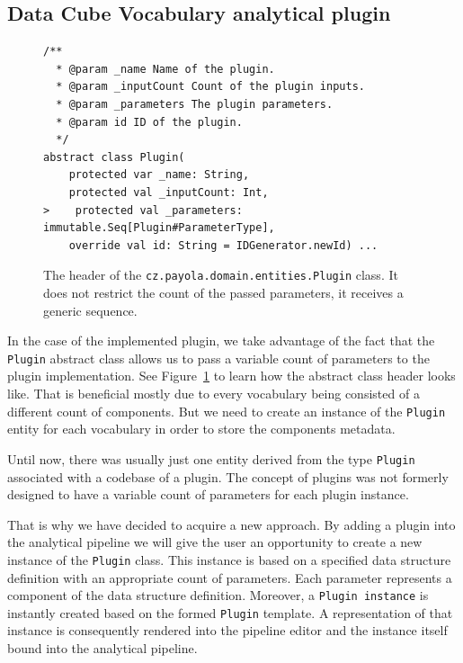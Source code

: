\subsection{Data Cube Vocabulary analytical plugin}

\begin{figure}
  \begin{verbatim}
/**
  * @param _name Name of the plugin.
  * @param _inputCount Count of the plugin inputs.
  * @param _parameters The plugin parameters.
  * @param id ID of the plugin.
  */
abstract class Plugin(
    protected var _name: String,
    protected val _inputCount: Int,
>    protected val _parameters: immutable.Seq[Plugin#ParameterType],
    override val id: String = IDGenerator.newId) ...
  \end{verbatim}
  \caption{The header of the \texttt{cz.payola.domain.entities.Plugin} class. It does not restrict the count
  of the passed parameters, it receives a generic sequence.}
  \label{fig:plugin-trait-code}
\end{figure}

In the case of the implemented plugin, we take advantage of the fact that the 
\texttt{Plugin} abstract class allows us to pass a variable count of parameters to the 
plugin implementation. See Figure~\ref{fig:plugin-trait-code} to learn how the abstract class header 
looks like. That is beneficial mostly due to every vocabulary being consisted of a 
different count of components. But we need to create an instance of the \texttt{Plugin} entity
for each vocabulary in order to store the components metadata.

Until now, there was usually just one entity derived from the type \texttt{Plugin} associated with
a codebase of a plugin. The concept of plugins was not formerly designed to have
a variable count of parameters for each plugin instance.

That is why we have decided to acquire a new approach. By adding a plugin 
into the analytical pipeline we will give the user an opportunity to create a 
new instance of the \texttt{Plugin} class. This instance is based on a specified data structure definition
with an appropriate count of parameters. Each parameter represents a component 
of the data structure definition. Moreover, a \texttt{Plugin instance} is instantly created 
based on the formed \texttt{Plugin} template. A representation of that instance is consequently 
rendered into the pipeline editor and the instance itself bound into the 
analytical pipeline.

